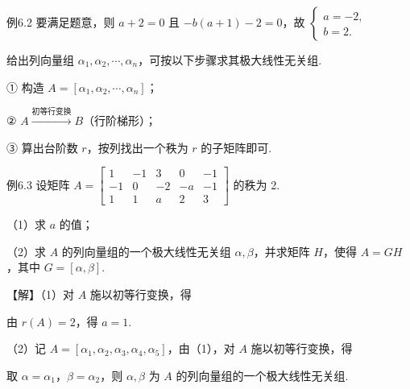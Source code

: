 \begin{fcard}{例6.2}
要满足题意，则 $a+2=0$ 且 $-b(a+1)-2=0$，故 $\begin{cases}a=-2,\\b=2.\end{cases}$
\end{fcard}


给出列向量组 $\alpha_1,\alpha_2,\cdots,\alpha_n$，可按以下步骤求其极大线性无关组.

① 构造 $A=[\alpha_1,\alpha_2,\cdots,\alpha_n]$；

② $A\xrightarrow{\text{初等行变换}}B$（行阶梯形）；

③ 算出台阶数 $r$，按列找出一个秩为 $r$ 的子矩阵即可.

\begin{fcard}{例6.3}
设矩阵 $A=\begin{bmatrix}1&-1&3&0&-1\\-1&0&-2&-a&-1\\1&1&a&2&3\end{bmatrix}$ 的秩为 2.

（1）求 $a$ 的值；

（2）求 $A$ 的列向量组的一个极大线性无关组 $\alpha,\beta$，并求矩阵 $H$，使得 $A=GH$，其中 $G=[\alpha,\beta]$.


【解】（1）对 $A$ 施以初等行变换，得


由 $r(A)=2$，得 $a=1$.

（2）记 $A=[\alpha_1,\alpha_2,\alpha_3,\alpha_4,\alpha_5]$，由（1），对 $A$ 施以初等行变换，得


取 $\alpha=\alpha_1$，$\beta=\alpha_2$，则 $\alpha,\beta$ 为 $A$ 的列向量组的一个极大线性无关组.


\end{fcard}
